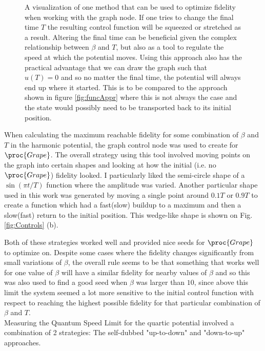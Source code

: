 \documentclass[a4paper, twocolumn]{revtex4-1}
\begin{document}
\begin{figure}
	\def\svgwidth{\columnwidth}
	
	\caption{A visualization of one method that can be used to optimize fidelity when working with the graph node. If one tries to change the final time $T$ the resulting control function will be squeezed or stretched as a result. Altering the final time can be beneficial given the complex relationship between $\beta$ and $T$, but also as a tool to regulate the speed at which the potential moves. Using this approach also has the practical advantage that we can draw the graph such that $u(T)=0$ and so no matter the final time, the potential will always end up where it started. This is to be compared to the approach shown in figure \ref{fig:funcAppr} where this is not always the case and the state would possibly need to be transported back to its initial position.}
	\label{fig:graphAppr}
\end{figure}

When calculating the maximum reachable fidelity for some combination of $\beta$ and $T$ in the harmonic potential, the graph control node was used to create for $\proc{Grape}$. The overall strategy using this tool involved moving points on the graph into certain shapes and looking at how the initial (i.e. no $\proc{Grape}$) fidelity looked. I particularly liked the semi-circle shape of a $\sin(\pi t/T)$ function where the amplitude was varied. Another particular shape used in this work was generated by moving a single point around $0.1T$ or $0.9T$ to create a function which had a fast(slow) buildup to a maximum and then a slow(fast) return to the initial position. This wedge-like shape is shown on Fig. \ref{fig:Controls} (b).

Both of these strategies worked well and provided nice seeds for $\proc{Grape}$ to optimize on. Despite some cases where the fidelity changes significantly from small variations of $\beta$, the overall rule seems to be that something that works well for one value of $\beta$ will have a similar fidelity for nearby values of $\beta$ and so this was also used to find a good seed when $\beta$ was larger than $10$, since above this limit the system seemed a lot more sensitive to the initial control function with respect to reaching the highest possible fidelity for that particular combination of $\beta$ and $T$. \\

Measuring the Quantum Speed Limit for the quartic potential involved a combination of 2 strategies: The self-dubbed "up-to-down" and "down-to-up" approaches. \\
\end{document}
